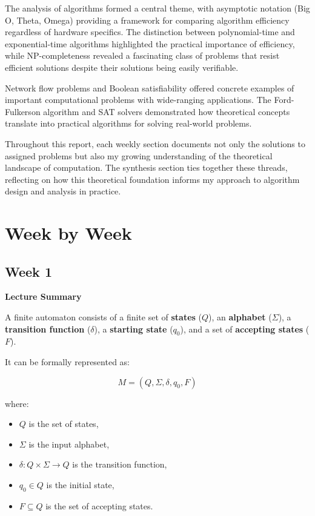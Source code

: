 \documentclass{article}
\theoremstyle{theorem}
\theoremstyle{definition}
\theoremstyle{remark}
\begin{document}
The analysis of algorithms formed a central theme, with asymptotic notation (Big O, Theta, Omega) providing a framework for comparing algorithm efficiency regardless of hardware specifics. The distinction between polynomial-time and exponential-time algorithms highlighted the practical importance of efficiency, while NP-completeness revealed a fascinating class of problems that resist efficient solutions despite their solutions being easily verifiable.

Network flow problems and Boolean satisfiability offered concrete examples of important computational problems with wide-ranging applications. The Ford-Fulkerson algorithm and SAT solvers demonstrated how theoretical concepts translate into practical algorithms for solving real-world problems.

Throughout this report, each weekly section documents not only the solutions to assigned problems but also my growing understanding of the theoretical landscape of computation. The synthesis section ties together these threads, reflecting on how this theoretical foundation informs my approach to algorithm design and analysis in practice.

\section{Week by Week}\label{homework}

\subsection{Week 1}
\textbf{Lecture Summary}

A finite automaton consists of a finite set of \textbf{states} ($Q$), an \textbf{alphabet} ($\Sigma$), a \textbf{transition function} ($\delta$), a \textbf{starting state} ($q_0$), and a set of \textbf{accepting states} ($F$). 

It can be formally represented as:

\[
M = (Q, \Sigma, \delta, q_0, F)
\]

where:
\begin{itemize}
    \item $Q$ is the set of states,
    \item $\Sigma$ is the input alphabet,
    \item $\delta: Q \times \Sigma \to Q$ is the transition function,
    \item $q_0 \in Q$ is the initial state,
    \item $F \subseteq Q$ is the set of accepting states.
\end{itemize}
\end{document}
